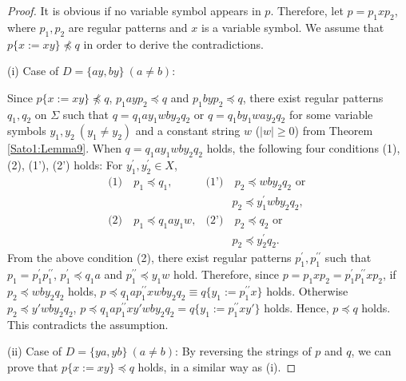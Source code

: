 \begin{proof}
It is obvious if no variable symbol appears in $p$. 
Therefore, let $p=p_{1}xp_{2}$, where $p_{1}, p_{2}$ are regular patterns and $x$ is a variable symbol.
We assume that $p \{ x := xy \} \not \preceq q$ in order to derive the contradictions.

\noindent
(i) 
Case of $D=\{ ay, by \} \ (a \ne b)$:

\noindent
Since $p \{ x := xy \} \not \preceq q$, $p_{1}ayp_{2}\preceq q$ and $p_{1}byp_{2}\preceq q$, 
there exist regular patterns $q_{1},q_{2}$ on $\Sigma$ such that $q=q_{1}ay_{1}wby_{2}q_{2}$ or $q=q_{1}by_{1}way_{2}q_{2}$ for some variable symbols $y_{1},y_{2}~(y_{1} \not= y_{2})$ and a constant string $w$ ($|w|\geq 0$) from Theorem \ref{Sato1:Lemma9}.
When $q=q_{1}ay_{1}wby_{2}q_{2}$ holds, the following four conditions (1), (2), (1'), (2') holds: For $y_{1}^{\prime}, y_{2}^{\prime}\in X$,
\begin{align*}
\textrm{(1)} & ~p_{1} \preceq q_{1}, & \textrm{(1')} & ~p_{2} \preceq wby_{2}q_{2} \mbox{ or }\\
& & & p_{2} \preceq y_{1}^{\prime}wby_{2}q_{2},\\
\textrm{(2)} & ~p_{1} \preceq q_{1}ay_{1}w, & \textrm{(2')} & ~p_{2} \preceq q_{2} \mbox{ or }\\
& & & p_{2} \preceq y_{2}^{\prime}q_{2}.
\end{align*}
From the above condition (2), there exist regular patterns $p_{1}^{\prime},p_{1}^{\prime\prime}$ such that $p_{1}=p_{1}^{\prime}p_{1}^{\prime\prime}$, $p_{1}^{\prime} \preceq q_{1}a$ and $p_{1}^{\prime\prime} \preceq y_{1}w$ hold.
Therefore, since $p=p_{1}xp_{2}=p_{1}^{\prime}p_{1}^{\prime\prime}xp_{2}$,
if $p_{2} \preceq wby_{2}q_{2}$ holds, 
$p\preceq q_{1}ap_{1}^{\prime\prime}xwby_{2}q_{2}\equiv q \{ y_{1} := p_{1}^{\prime\prime}x \}$ holds.
Otherwise $p_2\preceq y'wby_{2}q_{2}$, $p\preceq q_{1}ap_{1}^{\prime\prime}xy'wby_{2}q_{2}=q \{ y_{1} := p_{1}^{\prime\prime}xy' \}$ holds.
Hence, $p \preceq q$ holds.
This contradicts the assumption.

\noindent
(ii) 
Case of $D=\{ ya, yb \} \ (a \ne b)$:
By reversing the strings of $p$ and $q$, we can prove that $p \{ x := xy \} \preceq q$ holds, in a similar way as (i).
\end{proof}


